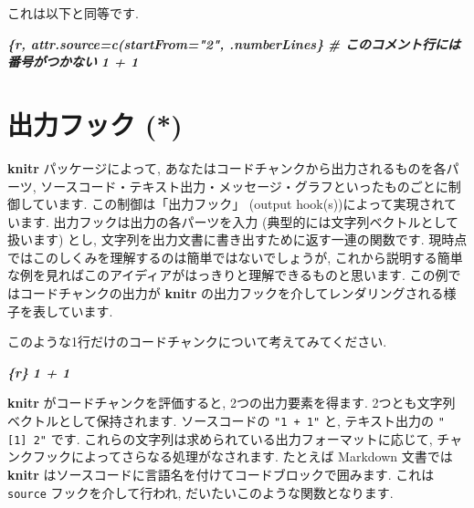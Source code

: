 \documentclass[
  11pt,
  lualatex,
  ja=standard]{bxjsreport}
\newenvironment{Shaded}{\begin{snugshade}}{\end{snugshade}}
\newcommand{\InformationTok}[1]{\textcolor[rgb]{0.56,0.35,0.01}{\textbf{\textit{#1}}}}
\begin{document}
これは以下と同等です.

\begin{Shaded}
\begin{Highlighting}[]
\InformationTok{\textasciigrave{}\textasciigrave{}\textasciigrave{}\{r, attr.source=c(\textquotesingle{}startFrom="2"\textquotesingle{}, \textquotesingle{}.numberLines\textquotesingle{}\}}
\InformationTok{\# このコメント行には番号がつかない}
\InformationTok{1 + 1}
\InformationTok{\textasciigrave{}\textasciigrave{}\textasciigrave{}}
\end{Highlighting}
\end{Shaded}

\hypertarget{output-hooks}{%
\chapter{出力フック (*)}\label{output-hooks}}

\textbf{knitr} パッケージによって, あなたはコードチャンクから出力されるものを各パーツ, ソースコード・テキスト出力・メッセージ・グラフといったものごとに制御しています. この制御は「出力フック」 (output hook(s))によって実現されています. 出力フックは出力の各パーツを入力 (典型的には文字列ベクトルとして扱います) とし, 文字列を出力文書に書き出すために返す一連の関数です. 現時点ではこのしくみを理解するのは簡単ではないでしょうが, これから説明する簡単な例を見ればこのアイディアがはっきりと理解できるものと思います. この例ではコードチャンクの出力が \textbf{knitr} の出力フックを介してレンダリングされる様子を表しています.

このような1行だけのコードチャンクについて考えてみてください.

\begin{Shaded}
\begin{Highlighting}[]
\InformationTok{\textasciigrave{}\textasciigrave{}\textasciigrave{}\{r\}}
\InformationTok{1 + 1}
\InformationTok{\textasciigrave{}\textasciigrave{}\textasciigrave{}}
\end{Highlighting}
\end{Shaded}

\textbf{knitr} がコードチャンクを評価すると, 2つの出力要素を得ます. 2つとも文字列ベクトルとして保持されます. ソースコードの \texttt{"1 + 1"} と, テキスト出力の \texttt{"{[}1{]}\ 2"} です. これらの文字列は求められている出力フォーマットに応じて, チャンクフックによってさらなる処理がなされます. たとえば Markdown 文書では \textbf{knitr} はソースコードに言語名を付けてコードブロックで囲みます. これは \texttt{source} フックを介して行われ, だいたいこのような関数となります.
\end{document}
